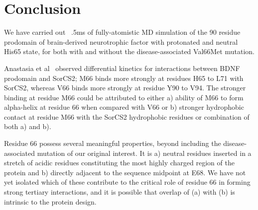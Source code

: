 \documentclass[journal=jacsat,manuscript=article]{achemso}
\newcommand{\grace}[1]{\textcolor{blue}{#1}}
\begin{document}
	
\newpage


\section*{Conclusion}

We have carried out ~.5ms of fully-atomistic MD simulation of the 90 residue prodomain of brain-derived neurotrophic factor with protonated and neutral His65 state, for both with and without the disease-associated Val66Met mutation.  

Anastasia et al~\cite{Anastasia2013} observed differential kinetics for interactions between BDNF prodomain and SorCS2; M66 binds more strongly at residues H65 to L71 with SorCS2, whereas V66 binds more strongly at residue Y90 to V94. 
The stronger binding at residue M66 could be attributed to either a) ability of M66 to form alpha-helix at residue 66 when compared with V66 or b) stronger hydrophobic contact at residue M66 with the SorCS2 hydrophobic residues or combination of both a) and b). 

Residue 66 possess several meaningful properties, beyond including the disease-associated mutation of our original interest. It is a) neutral residues inserted in a stretch of acidic residues constituting the most highly charged region of the protein and b) directly adjacent to the sequence midpoint at E68.  We have not yet isolated which of these contribute to the critical role of residue 66 in forming strong tertiary interactions, and it is possible that overlap of (a) with (b) is intrinsic to the protein design.  

	

%		
%
%
\end{document}
